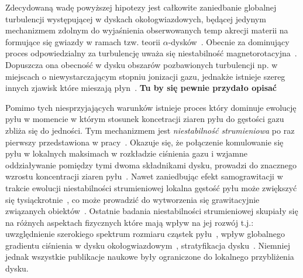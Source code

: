 \par Zdecydowaną wadę powyższej hipotezy jest całkowite zaniedbanie globalnej
turbulencji występującej w dyskach okołogwiazdowych, będącej jedynym
mechanizmem zdolnym do wyjaśnienia obserwowanych temp akrecji materii na
formujące się gwiazdy w ramach tzw. teorii $\alpha$-dysków~\citep{SS73}.
Obecnie za dominujący proces odpowiedzialny za turbulencję uważa się niestabilność
magnetorotacyjna~\citep{BH98}. Dopuszcza ona obecność w dysku obszarów pozbawionych
turbulencji np. w miejscach o niewystarczającym stopniu jonizacji gazu, jednakże
istnieje szereg innych zjawisk które mieszają płyn~\citep{LP10}.  {\bf Tu by się
pewnie przydało opisać}

\par Pomimo tych niesprzyjających warunków istnieje proces który dominuje
ewolucję pyłu w momencie w którym stosunek koncetracji ziaren pyłu do gęstości
gazu zbliża się do jedności. Tym mechanizmem jest {\it niestabilność
strumieniowa} po raz pierwszy przedstawiona w pracy~\cite{YG05}. Okazuje się, że
połączenie komulowanie się pyłu w lokalnych maksimach w rozkładzie ciśnienia
gazu i wzjamne oddziaływanie pomiędzy tymi dwoma składnikami dysku, prowadzi do
znacznego wzrostu koncentracji ziaren pyłu~\citep{J11}. Nawet zaniedbując efekt
samograwitacji w trakcie ewolucji niestabilności strumieniowej lokalna gęstość
pyłu może zwiększyć się tysiąckrotnie~\cite{JY07}, co może prowadzić do
wytworzenia się grawitacyjnie związanych obiektów~\cite{J07}. Ostatnie badania
niestabilności strumieniowej skupiały się na różnych aspektach fizycznych które
mają wpływ na jej rozwój t.j.: uwzględnienie szerokiego spektrum rozmiaru
cząstek pyłu~\cite{BS10a}, wpływ globalnego gradientu ciśnienia w dysku
okołogwiazdowym~\cite{BS10b}, stratyfikacja dysku~\cite{T12}. Niemniej jednak
wszystkie publikacje naukowe były ograniczone do lokalnego przybliżenia dysku.


